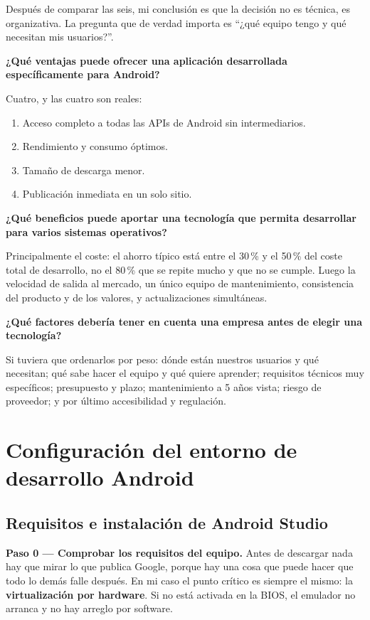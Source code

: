 \documentclass[11pt,a4paper]{article}
\newcommand{\campo}[1]{\textbf{\color{ink}#1}}
\begin{document}
	Después de comparar las seis, mi conclusión es que la decisión no es técnica, es organizativa. La pregunta que de verdad importa es \enquote{¿qué equipo tengo y qué necesitan mis usuarios?}.
	
	\campo{¿Qué ventajas puede ofrecer una aplicación desarrollada específicamente para Android?}
	
	Cuatro, y las cuatro son reales:
	\begin{enumerate}[leftmargin=*,itemsep=0.1em]
		\item Acceso completo a todas las APIs de Android sin intermediarios.
		\item Rendimiento y consumo óptimos.
		\item Tamaño de descarga menor.
		\item Publicación inmediata en un solo sitio.
	\end{enumerate}
	
	\campo{¿Qué beneficios puede aportar una tecnología que permita desarrollar para varios sistemas operativos?}
	
	Principalmente el coste: el ahorro típico está entre el 30\,\% y el 50\,\% del coste total de desarrollo, no el 80\,\% que se repite mucho y que no se cumple. Luego la velocidad de salida al mercado, un único equipo de mantenimiento, consistencia del producto y de los valores, y actualizaciones simultáneas.
	
	\campo{¿Qué factores debería tener en cuenta una empresa antes de elegir una tecnología?}
	
	Si tuviera que ordenarlos por peso: dónde están nuestros usuarios y qué necesitan; qué sabe hacer el equipo y qué quiere aprender; requisitos técnicos muy específicos; presupuesto y plazo; mantenimiento a 5 años vista; riesgo de proveedor; y por último accesibilidad y regulación.
	
	
	\newpage
	\section{Configuración del entorno de desarrollo Android}
	
	\subsection{Requisitos e instalación de Android Studio}
	
	\campo{Paso 0 --- Comprobar los requisitos del equipo.}
	Antes de descargar nada hay que mirar lo que publica Google, porque hay una cosa que puede hacer que todo lo demás falle después. En mi caso el punto crítico es siempre el mismo: la \textbf{virtualización por hardware}. Si no está activada en la BIOS, el emulador no arranca y no hay arreglo por software.
	
\end{document}
